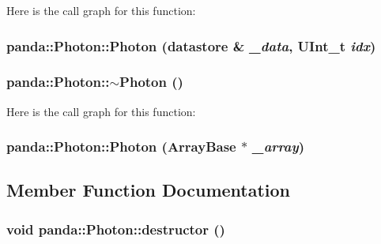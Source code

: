 Here is the call graph for this function:\hypertarget{classpanda_1_1Photon_a7ad114af287803e52d9d82e2d71a36db}{
\subsubsection[{Photon}]{\setlength{\rightskip}{0pt plus 5cm}panda::Photon::Photon ({\bf datastore} \& {\em \_\-data}, \/  UInt\_\-t {\em idx})}}
\label{classpanda_1_1Photon_a7ad114af287803e52d9d82e2d71a36db}
\hypertarget{classpanda_1_1Photon_abe98765774ca8c543ed105e5e2592a31}{
\subsubsection[{$\sim$Photon}]{\setlength{\rightskip}{0pt plus 5cm}panda::Photon::$\sim$Photon ()}}
\label{classpanda_1_1Photon_abe98765774ca8c543ed105e5e2592a31}


Here is the call graph for this function:\hypertarget{classpanda_1_1Photon_a0f96aaa96ea64de858f98605985eaa3c}{
\subsubsection[{Photon}]{\setlength{\rightskip}{0pt plus 5cm}panda::Photon::Photon ({\bf ArrayBase} $\ast$ {\em \_\-array})}}
\label{classpanda_1_1Photon_a0f96aaa96ea64de858f98605985eaa3c}


\subsection{Member Function Documentation}
\hypertarget{classpanda_1_1Photon_a03611f9014bd137d9aa651ac938575c7}{
\subsubsection[{destructor}]{\setlength{\rightskip}{0pt plus 5cm}void panda::Photon::destructor ()}}
\label{classpanda_1_1Photon_a03611f9014bd137d9aa651ac938575c7}


